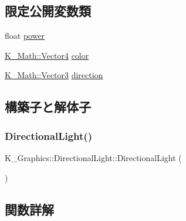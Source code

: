 \subsection*{限定公開変数類}
\begin{DoxyCompactItemize}
\item 
float \mbox{\hyperlink{class_k___graphics_1_1_directional_light_a537dfbbe17c8c6cf0e827a74aa3d62c9}{power}}
\item 
\mbox{\hyperlink{namespace_k___math_a8d82de9de17eae460600de1e40e8a01f}{K\+\_\+\+Math\+::\+Vector4}} \mbox{\hyperlink{class_k___graphics_1_1_directional_light_a136a2152a4f66c7c8f9676abc2c7211c}{color}}
\item 
\mbox{\hyperlink{namespace_k___math_a66884d78082c39ada4091c211f3570f8}{K\+\_\+\+Math\+::\+Vector3}} \mbox{\hyperlink{class_k___graphics_1_1_directional_light_aa2fe5f127475e2751039b9636e3e3487}{direction}}
\end{DoxyCompactItemize}


\subsection{構築子と解体子}
\mbox{\label{class_k___graphics_1_1_directional_light_a59cd654e88bff0875908bf87bb5e0f05}} 
\subsubsection{\texorpdfstring{Directional\+Light()}{DirectionalLight()}}
{\footnotesize\ttfamily K\+\_\+\+Graphics\+::\+Directional\+Light\+::\+Directional\+Light (\begin{DoxyParamCaption}{ }\end{DoxyParamCaption})}



\subsection{関数詳解}
\mbox{\label{class_k___graphics_1_1_directional_light_a091844225b764f4a59038b6f39f1f56e}} 
